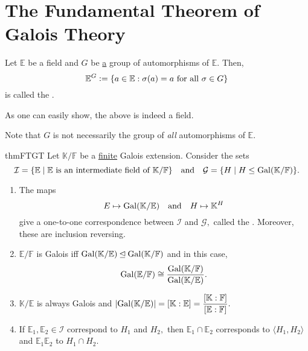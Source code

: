 \section{The Fundamental Theorem of Galois Theory}
\begin{defn}%
    Let $\mathbb{E}$ be a field and $G$ be \underline{a} group of automorphisms of $\mathbb{E}.$ Then,
    \begin{equation*} 
        \mathbb{E}^G \vcentcolon= \{a \in \mathbb{E} : \sigma(a) = a \text{ for all } \sigma \in G\}
    \end{equation*}
    is called the .
\end{defn}
\begin{rem}
    As one can easily show, the above is indeed a field. 

    Note that $G$ is not necessarily the group of \emph{all} automorphisms of $\mathbb{E}.$
\end{rem}

\begin{restatable}{thm}{FTGT}
\label{thm:FTGT}
    Let $\mathbb{K}/\mathbb{F}$ be a \underline{finite} Galois extension. Consider the sets
    \begin{equation*} 
        \mathcal{I} = \{\mathbb{E} \mid \mathbb{E} \text{ is an intermediate field of }\mathbb{K}/\mathbb{F}\} \quad\text{and}\quad \mathcal{G} = \{H \mid H \le \operatorname{Gal}(\mathbb{K}/\mathbb{F})\}.
    \end{equation*}
    \begin{enumerate}
         \item \label{item:G1} The maps 
         \begin{equation*} 
             E \mapsto \operatorname{Gal}(\mathbb{K}/\mathbb{E}) \quad\text{and}\quad H \mapsto \mathbb{K}^H
         \end{equation*}
         give a one-to-one correspondence between $\mathcal{I}$ and $\mathcal{G},$ called the . Moreover, these are inclusion reversing.
         \item \label{item:G2} $\mathbb{E}/\mathbb{F}$ is Galois iff $\operatorname{Gal}(\mathbb{K}/\mathbb{E}) \unlhd \operatorname{Gal}(\mathbb{K}/\mathbb{F})$ and in this case,
         \begin{equation*} 
             \operatorname{Gal}(\mathbb{E}/\mathbb{F}) \cong \frac{\operatorname{Gal}(\mathbb{K}/\mathbb{F})}{\operatorname{Gal}(\mathbb{K}/\mathbb{E})}.
         \end{equation*}
         \item \label{item:G3} $\mathbb{K}/\mathbb{E}$ is always Galois and ${\left\lvert \operatorname{Gal}(\mathbb{K}/\mathbb{E}) \right\lvert} = [\mathbb{K} : \mathbb{E}] = \dfrac{[\mathbb{K} : \mathbb{F}]}{[\mathbb{E} : \mathbb{F}]}.$
         \item \label{item:G5} If $\mathbb{E}_1, \mathbb{E}_2 \in \mathcal{I}$ correspond to $H_1$ and $H_2,$ then $\mathbb{E}_1 \cap \mathbb{E}_2$ corresponds to $\langle H_1, H_2\rangle$ and $\mathbb{E}_1\mathbb{E}_2$ to $H_1 \cap H_2.$
     \end{enumerate} \hfill\hyperref[thm:FTGT2]{\downsym}
\end{restatable}

